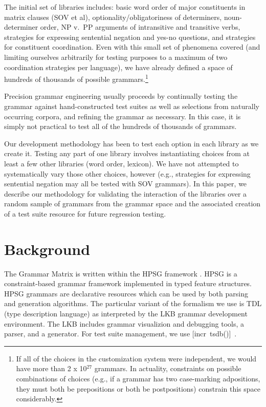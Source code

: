 \documentclass[11pt]{article}
\newcommand{\itsdb}{\mbox{[incr tsdb()]}}
\begin{document}
The initial set of libraries includes: basic word order of major
constituents in matrix clauses (SOV et al), optionality/obligatoriness
of determiners, noun-determiner order, NP v.\ PP arguments of intransitive
and transitive verbs, strategies for expressing sentential
negation and yes-no questions, and strategies for constituent coordination.
Even with this small set of phenomena covered (and limiting ourselves
arbitrarily for testing purposes to a maximum of two coordination strategies
per language), we have already defined a space of hundreds of thousands of possible
grammars.\footnote{If all of the choices in the customization system
were independent, we would have more than 2 x 10$^{27}$ grammars.  In actuality,
constraints on possible combinations of choices (e.g., if a grammar
has two case-marking adpositions, they must both be prepositions or
both be postpositions) constrain this space considerably.}

Precision grammar engineering usually proceeds by continually
testing the grammar against hand-constructed test suites as well
as selections from naturally occurring corpora, and refining the
grammar as necessary.  In this case, it is simply not practical to
test all of the hundreds of thousands of grammars.  

Our development methodology has been to test each option in each
library as we create it.  Testing any part of one library involves
instantiating choices from at least a few other libraries (word order,
lexicon).  We have not attempted to systematically vary those other
choices, however (e.g., strategies for expressing
sentential negation may all be tested with SOV grammars).  In this
paper, we describe our methodology for validating the interaction
of the libraries over a random sample of grammars from the 
grammar space and the associated creation of a test suite resource for
future regression testing. 

\section{Background}

The Grammar Matrix is written within the HPSG framework
\cite{Pol:Sag:94,Sag:Was:Ben:03}.  HPSG is a constraint-based grammar
framework implemented in typed feature structures.  HPSG grammars are
declarative resources which can be used by both parsing and generation
algorithms.  The particular variant of the formalism we use is TDL
(type description language) as interpreted by the LKB
\cite{Copestake02} grammar development environment.  The LKB includes
grammar visualizion and debugging tools, a parser, and a generator. 
For test suite management, we use \itsdb\ \cite{Oepen:01}.
\end{document}

